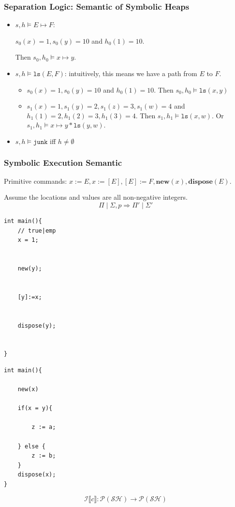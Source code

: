 \documentclass[aspectratio=1610, 13pt]{beamer}
\begin{document}
\begin{frame}\frametitle{Separation Logic: Semantic of Symbolic Heaps}
\begin{example}
    \begin{itemize}
        \item $s,h\models E\mapsto F$: 
        
        $s_0(x) = 1, s_0(y) = 10$ and $h_0(1) = 10$. 
        
        Then $s_0,h_0\models x\mapsto y$.
        \vspace{2em}
        \item $s,h\models \texttt{ls}(E,F)$: intuitively, this means we have a path from $E$ to $F$.
        \begin{itemize}
            \item $s_0(x) = 1, s_0(y) = 10$ and $h_0(1) = 10$. Then $s_0,h_0\models \texttt{ls}(x,y)$
            \item $s_1(x) = 1, s_1(y) = 2, s_1(z) = 3, s_1(w) = 4$ and $h_1(1) = 2, h_1(2)=3, h_1(3) = 4$. Then $s_1, h_1\models \texttt{ls}(x,w)$. Or $s_1, h_1\models x\mapsto y * \texttt{ls}(y,w)$.
        \end{itemize}
        
        \vspace{4em}
        \item $s,h\models \texttt{junk}$ iff $h\ne \emptyset$
    \end{itemize}
    \end{example}
\end{frame}


\begin{frame}[fragile]\frametitle{Symbolic Execution Semantic}
Primitive commands: $x:=E,x:=[E],[E]:=F,\mathbf{new}(x),\mathbf{dispose}(E)$.

Assume the locations and values are all non-negative integers.
\[\Pi\mid \Sigma , p\Longrightarrow \Pi'\mid \Sigma' \]
\begin{multicols}{2}
\begin{lstlisting}
int main(){
	// true|emp
	x = 1;
	
	
	new(y);
	
	
	[y]:=x;


	dispose(y);
	
	
}

\end{lstlisting}
\begin{lstlisting}
int main(){

	new(x)
	
	if(x = y){
	
		z := a;
		
	} else {
		z := b;
	}
	dispose(x);
}

\end{lstlisting}\[\mathcal{I}\llbracket c \rrbracket : \mathcal{P(SH)} \rightarrow \mathcal{P(SH)} \]
\end{multicols}
\end{frame}
\end{document}
